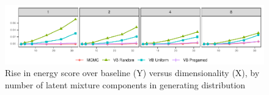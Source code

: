 \begin{figure}[ht]
    \caption{Rise in energy score over baseline (Y) versus dimensionality (X), 
            by number of latent mixture components in generating distribution
            \label{fig:energyscore}}
    \includegraphics{./plots/energy_score}
\end{figure}


